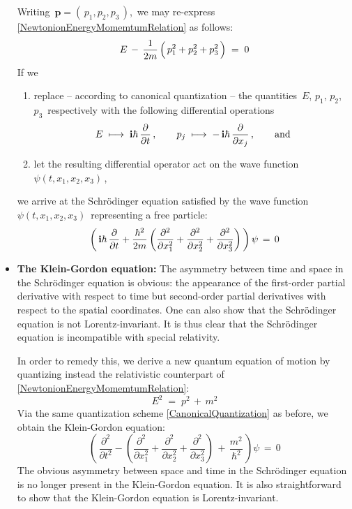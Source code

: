 \begin{itemize}
	Writing
	\,$\mathbf{p} = (\,p_{1},p_{2},p_{3}\,)$,\,
	we may re-express
	\eqref{NewtonionEnergyMomemtumRelation}
	as follows:
	\begin{equation*}
	E \,-\, \dfrac{1}{2m}\left(\,p_{1}^{2} \overset{{\color{white}.}}{+} p_{2}^{2} + p_{3}^{2}\,\right) \;=\; 0
	\end{equation*}
	If we
	\begin{enumerate}
	\item
		replace -- according to canonical quantization -- the quantities
		\,$E$, $p_{1}$, $p_{2}$, $p_{3}$\,
		respectively with the following differential operations
		\begin{equation}
		\label{CanonicalQuantization}
		E \;\longmapsto\; \textnormal{\bf i}\hbar\,\dfrac{\partial}{\partial t}\,,
		\quad\quad
		p_{j} \;\longmapsto\; -\,\textnormal{\bf i}\hbar\,\dfrac{\partial}{\partial x_{j}}\,,
		\quad\quad
		\textnormal{and}
		\end{equation}
	\item
		let the resulting differential operator act on the wave function
		\,$\psi(t,x_{1},x_{2},x_{3})$\,,\,
	\end{enumerate}
	we arrive at the Schr\"odinger equation satisfied by the wave function
	\,$\psi(t,x_{1},x_{2},x_{3})$\,
	representing a free particle:
	\begin{equation*}
	\left(\,\textnormal{\bf i}\hbar\,\dfrac{\partial}{\partial t} + \dfrac{\hbar^{2}}{2m}
		\left(
			\dfrac{\partial^{2}}{\partial x_{1}^{2}}
			+ \dfrac{\partial^{2}}{\partial x_{2}^{2}}
			+ \dfrac{\partial^{2}}{\partial x_{3}^{2}}
			\right)
		\,\right)
	\psi
	\,=\,
		0
	\end{equation*}
\item
	\textbf{The Klein-Gordon equation:}
	\vskip 0.01cm
	The asymmetry between time and space in the Schr\"odinger equation is obvious:
	the appearance of the first-order partial derivative with respect to time
	but second-order partial derivatives with respect to the spatial coordinates.
	One can also show that the Schr\"odinger equation is not Lorentz-invariant.
	It is thus clear that the Schr\"odinger equation is incompatible with special relativity.
	
	In order to remedy this, we derive a new quantum equation of motion by quantizing instead
	the relativistic counterpart of \eqref{NewtonionEnergyMomemtumRelation}:
	\begin{equation}
	\label{RelativisticEnergyMomemtumRelation}
	E^{2} \;=\; p^{2} \,+\, m^{2}
	\end{equation}
	Via the same quantization scheme
	\eqref{CanonicalQuantization}
	as before, we obtain the Klein-Gordon equation:
	\begin{equation*}
	\left(\,\dfrac{\partial^{2}}{\partial t^{2}}
	- \left(
		\dfrac{\partial^{2}}{\partial x_{1}^{2}}
		+ \dfrac{\partial^{2}}{\partial x_{2}^{2}}
		+ \dfrac{\partial^{2}}{\partial x_{3}^{2}}
		\right)
	\,+\,
		\dfrac{m^{2}}{\hbar^{2}}
		\,\right)
	\psi
	\,=\,
		0
	\end{equation*}
	The obvious asymmetry between space and time in the Schr\"odinger equation is no longer
	present in the Klein-Gordon equation.
	It is also straightforward to show that the Klein-Gordon equation is Lorentz-invariant.
	

\end{itemize}
